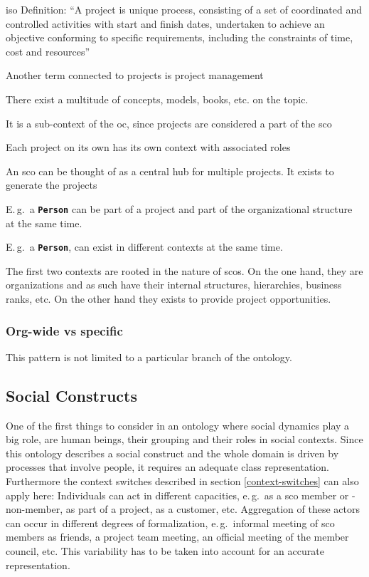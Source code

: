 \documentclass[a4paper, DIV=13, BCOR=0cm]{scrbook}
\newcommand{\eg}{e.\,g.\ }
\newcommand{\Eg}{E.\,g.\ }
\newcommand{\class}[1]{\texttt{\textbf{#1}}}
\begin{document}
\gls{iso} Definition: \enquote{A project is unique process, consisting of a set of coordinated and controlled activities with start and finish dates, undertaken to achieve an objective conforming to specific requirements, including the constraints of time, cost and resources} \cite{iso-9000-2015}



Another term connected to projects is project management

There exist a multitude of concepts, models, books, etc. on the topic.

It is a sub-context of the \gls{oc}, since projects are considered a part of the \gls{sco}

Each project on its own has its own context with associated roles

An \gls{sco} can be thought of as a central hub for multiple projects. It exists to generate the projects 

\Eg a \class{Person} can be part of a project and part of the organizational structure at the same time.

\Eg a \class{Person}, can exist in different contexts at the same time.

The first two contexts are rooted in the nature of \glspl{sco}. On the one hand, they are organizations and as such have their internal structures, hierarchies, business ranks, etc. On the other hand they exists to provide project opportunities. 

\subsubsection{Org-wide vs specific}

This pattern is not limited to a particular branch of the ontology.

\subsection{Social Constructs }
One of the first things to consider in an ontology where social dynamics play a big role, are human beings, their grouping and their roles in social contexts. Since this ontology describes a social construct and the whole domain is driven by processes that involve people, it requires an adequate class representation. Furthermore the context switches described in section \ref{context-switches} can also apply here: Individuals can act in different capacities, \eg as a \gls{sco} member or -non-member, as part of a project, as a customer, etc. Aggregation of these actors can occur in different degrees of formalization, \eg informal meeting of \gls{sco} members as friends, a project team meeting, an official meeting of the member council, etc. This variability has to be taken into account for an accurate representation.
\end{document}
